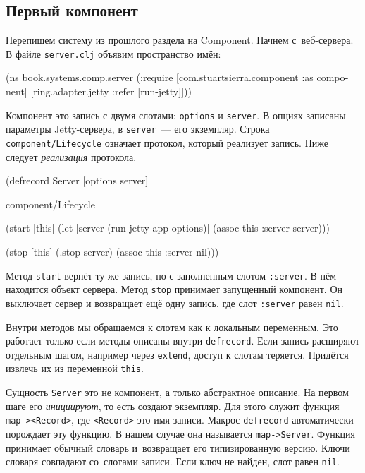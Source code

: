 \subsection{Первый компонент}

Перепишем систему из прошлого раздела на Component. Начнем с~веб-сервера. В
файле \verb|server.clj| объявим пространство имён:

\begin{english}
  \begin{clojure}
(ns book.systems.comp.server
  (:require
   [com.stuartsierra.component :as component]
   [ring.adapter.jetty :refer [run-jetty]]))
  \end{clojure}
\end{english}

Компонент это запись с двумя слотами: \verb|options| и \verb|server|. В
опциях записаны параметры Jetty-сервера, в \verb|server|~--- его
экземпляр. Строка \verb|component/Lifecycle| означает протокол, который
реализует запись. Ниже следует \emph{реализация} протокола.

\begin{english}
  \begin{clojure}
(defrecord Server [options server]

  component/Lifecycle

  (start [this]
    (let [server (run-jetty app options)]
      (assoc this :server server)))

  (stop [this]
    (.stop server)
    (assoc this :server nil)))
  \end{clojure}
\end{english}

Метод \verb|start| вернёт ту же запись, но с заполненным слотом
\verb|:server|. В нём находится объект сервера. Метод \verb|stop| принимает
запущенный компонент. Он выключает сервер и возвращает ещё одну запись, где слот
\verb|:server| равен \verb|nil|.


Внутри методов мы обращаемся к слотам как к локальным переменным. Это работает
только если методы описаны внутри \verb|defrecord|. Если запись расширяют
отдельным шагом, например через \verb|extend|, доступ к слотам
теряется. Придётся извлечь их из переменной \verb|this|.

Сущность \verb|Server| это не компонент, а только абстрактное описание. На
первом шаге его \emph{инициируют}, то есть создают экземпляр. Для этого служит
функция \verb|map-><Record>|, где \verb|<Record>| это имя записи. Макрос
\verb|defrecord| автоматически порождает эту функцию. В нашем случае она
называется \verb|map->Server|. Функция принимает обычный словарь и~возвращает
его типизированную версию. Ключи словаря совпадают со~слотами записи. Если ключ
не найден, слот равен \verb|nil|.

